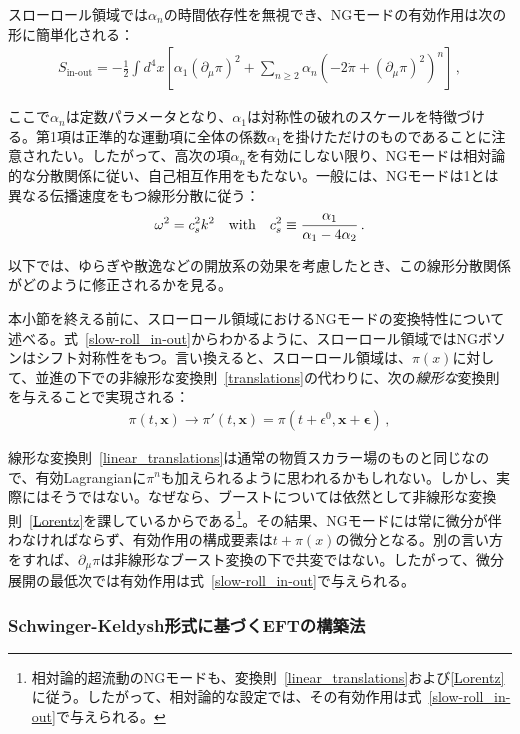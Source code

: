 \medskip
スローロール領域では$\alpha_n$の時間依存性を無視でき、NGモードの有効作用は次の形に簡単化される：
\begin{align}
 \label{slow-roll_in-out}
 S_{\text{in-out}} 
 = - \frac{1}{2} \int d^4x
 \left[ \alpha_1 (\partial_\mu\pi)^2 + 
 \sum_{n\geq2} \alpha_n \left(-2\dot{\pi} + (\partial_\mu\pi)^2 \right)^n
 \right]\,,
\end{align}

ここで$\alpha_n$は定数パラメータとなり、$\alpha_1$は対称性の破れのスケールを特徴づける。第1項は正準的な運動項に全体の係数$\alpha_1$を掛けただけのものであることに注意されたい。したがって、高次の項$\alpha_n$を有効にしない限り、NGモードは相対論的な分散関係に従い、自己相互作用をもたない。一般には、NGモードは1とは異なる伝播速度をもつ線形分散に従う：
\begin{equation}
 \omega^2 = c_s^2 k^2 {\quad\mathrm{with}}\quad 
  c_s^2 \equiv \frac{\alpha_1}{ \alpha_1 - 4 \alpha_2}\,.
\end{equation}

以下では、ゆらぎや散逸などの開放系の効果を考慮したとき、この線形分散関係がどのように修正されるかを見る。

\medskip
本小節を終える前に、スローロール領域におけるNGモードの変換特性について述べる。式~\eqref{slow-roll_in-out}からわかるように、スローロール領域ではNGボソンはシフト対称性をもつ。言い換えると、スローロール領域は、$\pi(x)$に対して、並進の下での非線形な変換則~\eqref{translations}の代わりに、次の\textit{線形な}変換則を与えることで実現される：
\begin{align}
 \label{linear_translations}
 \pi(t,\mathbf{x}) 
 \to \pi'(t,\mathbf{x}) 
 = \pi (t + \epsilon^0,\mathbf{x} + \mathbf{\epsilon}) \,,
\end{align}

線形な変換則~\eqref{linear_translations}は通常の物質スカラー場のものと同じなので、有効Lagrangianに$\pi^{n}$も加えられるように思われるかもしれない。しかし、実際にはそうではない。なぜなら、ブーストについては依然として非線形な変換則~\eqref{Lorentz}を課しているからである\footnote{相対論的超流動のNGモードも、変換則~\eqref{linear_translations}および\eqref{Lorentz}に従う。したがって、相対論的な設定では、その有効作用は式~\eqref{slow-roll_in-out}で与えられる。}。その結果、NGモードには常に微分が伴わなければならず、有効作用の構成要素は$t+\pi(x)$の微分となる。別の言い方をすれば、$\partial_{\mu}\pi$は非線形なブースト変換の下で共変ではない。したがって、微分展開の最低次では有効作用は式~\eqref{slow-roll_in-out}で与えられる。

\subsubsection{Schwinger-Keldysh形式に基づくEFTの構築法}
\label{subsec:EFT_in-in}


